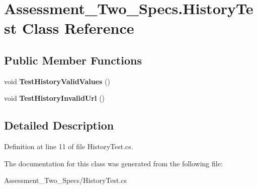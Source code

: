 \hypertarget{class_assessment___two___specs_1_1_history_test}{
\section{Assessment\_\-Two\_\-Specs.HistoryTest Class Reference}
\label{class_assessment___two___specs_1_1_history_test}
}
\subsection*{Public Member Functions}
\begin{DoxyCompactItemize}
\item 
\hypertarget{class_assessment___two___specs_1_1_history_test_a4aab5dff2e8e1403257dd2650c7b9425}{
void {\bfseries TestHistoryValidValues} ()}
\label{class_assessment___two___specs_1_1_history_test_a4aab5dff2e8e1403257dd2650c7b9425}

\item 
\hypertarget{class_assessment___two___specs_1_1_history_test_a9d9888f1da30c7f3df468d6ad84937bc}{
void {\bfseries TestHistoryInvalidUrl} ()}
\label{class_assessment___two___specs_1_1_history_test_a9d9888f1da30c7f3df468d6ad84937bc}

\end{DoxyCompactItemize}


\subsection{Detailed Description}


Definition at line 11 of file HistoryTest.cs.



The documentation for this class was generated from the following file:\begin{DoxyCompactItemize}
\item 
Assessment\_\-Two\_\-Specs/HistoryTest.cs\end{DoxyCompactItemize}
